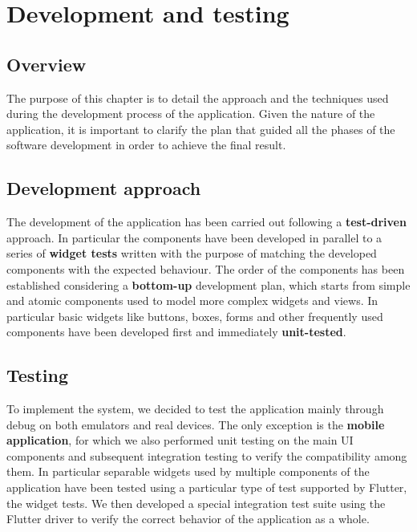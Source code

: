 \documentclass[../../dd.tex]{subfiles}
\begin{document}
\chapter{Development and testing}
    \section{Overview}
	The purpose of this chapter is to detail the approach and the techniques used during the development process of the application. Given the nature of the application, it is important to clarify the plan that guided all the phases of the software development in order to achieve the final result.

	\section{Development approach}
    The development of the application has been carried out following a \textbf{test-driven} approach. In particular the components have been developed in parallel to a series of
	\textbf{widget tests} written with the purpose of matching the developed components with the expected behaviour. The order of the components has been established considering
	a \textbf{bottom-up} development plan, which starts from simple and atomic components used to model more complex widgets and views. In particular basic widgets like buttons, boxes,
	forms and other frequently used components have been developed first and immediately \textbf{unit-tested}.

	\section{Testing}
	To implement the system, we decided to test the application mainly through debug on both emulators and real devices. The only exception is the \textbf{mobile application}, for which we also performed unit testing on the main UI components and subsequent integration testing to verify the compatibility among them. In particular separable widgets used by multiple components of the application have been tested using a particular type of test supported by Flutter, the widget tests. We then developed a special integration test suite using the Flutter driver to verify the correct behavior of the application as a whole.
\end{document}
